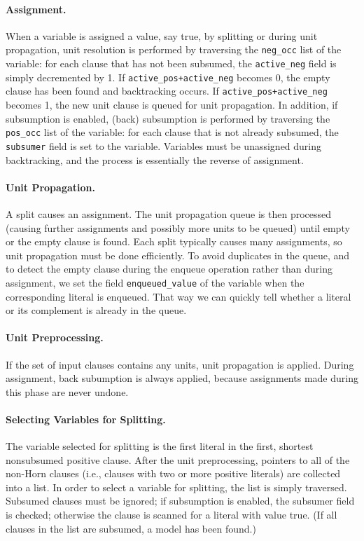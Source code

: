 \paragraph{Assignment.}
When a variable is assigned a value, say true, by splitting or during
unit propagation, unit resolution is performed by traversing the
\verb:neg_occ: list of the variable: for each clause that has not
been subsumed, the \verb:active_neg: field is simply decremented by 1.
If \verb:active_pos+active_neg: becomes 0, the empty clause has been
found and backtracking occurs.  If \verb:active_pos+active_neg:
becomes 1, the new unit clause is queued for unit propagation.  In
addition, if subsumption is enabled, (back) subsumption is performed
by traversing the
\verb:pos_occ: list of the variable: for each clause that is not
already subsumed, the \verb:subsumer: field is set to the variable.
Variables must be unassigned during backtracking, and the process is 
essentially the reverse of assignment.

\paragraph{Unit Propagation.}
A split causes an assignment.  The unit propagation queue is then
processed (causing further assignments and possibly more units to be
queued) until empty or the empty clause is found.  Each split
typically causes many assignments, so unit propagation must be done
efficiently.  To avoid duplicates in the queue, and to detect
the empty clause during the enqueue operation rather than during
assignment, we set the field \verb:enqueued_value: of the variable
when the corresponding literal is enqueued.  That way we can quickly
tell whether a literal or its complement is already in the queue.

\paragraph{Unit Preprocessing.}
If the set of input clauses contains any units, unit propagation is
applied.  During assignment, back subumption is always applied,
because assignments made during this phase are never undone.

\paragraph{Selecting Variables for Splitting.}
The variable selected for splitting is the first literal in the first,
shortest nonsubsumed positive clause.  After the unit preprocessing,
pointers to all of the non-Horn clauses (i.e., clauses with two or more
positive literals) are collected into a list.  In order to select a variable
for splitting, the list is simply traversed.  Subsumed clauses must be
ignored; if subsumption is enabled, the subsumer field is checked;
otherwise the clause is scanned for a literal with value true.
(If all clauses in the list are subsumed, a model has been found.)

